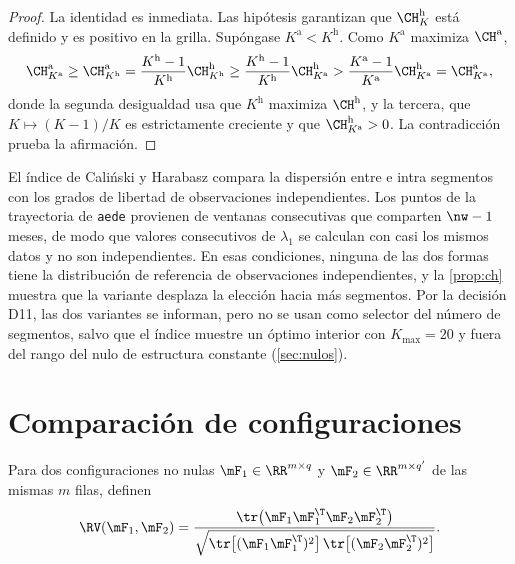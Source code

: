 \begin{proof}
La identidad es inmediata. Las hipótesis garantizan que $\CH^{\mathrm h}_K$ está definido y es
positivo en la grilla. Supóngase $K^{\mathrm a}<K^{\mathrm h}$. Como $K^{\mathrm a}$ maximiza
$\CH^{\mathrm a}$,
\[
  \CH^{\mathrm a}_{K^{\mathrm a}}\ge\CH^{\mathrm a}_{K^{\mathrm h}}
  =\frac{K^{\mathrm h}-1}{K^{\mathrm h}}\CH^{\mathrm h}_{K^{\mathrm h}}
  \ge\frac{K^{\mathrm h}-1}{K^{\mathrm h}}\CH^{\mathrm h}_{K^{\mathrm a}}
  >\frac{K^{\mathrm a}-1}{K^{\mathrm a}}\CH^{\mathrm h}_{K^{\mathrm a}}
  =\CH^{\mathrm a}_{K^{\mathrm a}},
\]
donde la segunda desigualdad usa que $K^{\mathrm h}$ maximiza $\CH^{\mathrm h}$, y la tercera, que
$K\mapsto(K-1)/K$ es estrictamente creciente y que $\CH^{\mathrm h}_{K^{\mathrm a}}>0$. La
contradicción prueba la afirmación.
\end{proof}

\begin{observacion}\label{obs:ch}
El índice de Caliński y Harabasz compara la dispersión entre e intra segmentos con los grados de
libertad de observaciones independientes. Los puntos de la trayectoria de \texttt{aede}
provienen de ventanas consecutivas que comparten $\nw-1$ meses, de modo que valores consecutivos
de $\lambda_1$ se calculan con casi los mismos datos y no son independientes. En esas
condiciones, ninguna de las dos formas tiene la distribución de referencia de observaciones
independientes, y la \cref{prop:ch} muestra que la variante desplaza la elección hacia más
segmentos. Por la decisión D11, las dos variantes se informan, pero no se usan como selector del
número de segmentos, salvo que el índice muestre un óptimo interior con $K_{\max}=20$ y fuera del
rango del nulo de estructura constante (\cref{sec:nulos}).
\end{observacion}

\section{Comparación de configuraciones}
\label{sec:comparacion}

\begin{definicion}[Coeficiente RV]\label{def:rv}
Para dos configuraciones no nulas $\mF_1\in\RR^{m\times q}$ y $\mF_2\in\RR^{m\times q'}$ de las
mismas $m$ filas,
\textcite{robert_escoufier_1976} definen
\begin{equation}\label{eq:rv}
  \RV(\mF_1,\mF_2)=\frac{\tr\bigl(\mF_1\mF_1^{\T}\mF_2\mF_2^{\T}\bigr)}
  {\sqrt{\tr\bigl[(\mF_1\mF_1^{\T})^2\bigr]\,\tr\bigl[(\mF_2\mF_2^{\T})^2\bigr]}} .
\end{equation}
\end{definicion}

